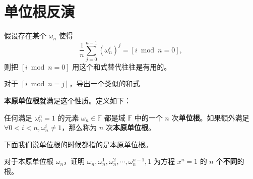 \section{单位根反演}
    假设存在某个 $\omega_n$ 使得
    $$
    \frac{1}{n}\sum_{j=0}^{n-1}(\omega_n^i)^j=[i\bmod n=0],
    $$
    则把 $[i\bmod n=0]$ 用这个和式替代往往是有用的。
    \begin{exercise}
    对于 $[i\bmod n=j]$，导出一个类似的和式
    \end{exercise}

    \textbf{本原单位根}就满足这个性质。定义如下：
    \begin{definition}
        任何满足 $\omega_n^n=1$ 的元素 $\omega_n\in\mathbb F$ 都是域 $\mathbb F$ 中的一个 $n$ 次\textbf{单位根}。如果额外满足 $\forall 0<i<n,\omega_n^i\ne 1$，那么称为 $n$ 次\textbf{本原单位根}。  
    \end{definition}

    下面我们说单位根的时候都指的是本原单位根。

    \begin{exercise}
        对于本原单位根 $\omega_n$，证明 $\omega_n,\omega_n^1,\omega_n^2,\cdots,\omega_n^{n-1},1$ 为方程 $x^n=1$ 的 $n$ 个\textbf{不同}的根。
    \end{exercise}

